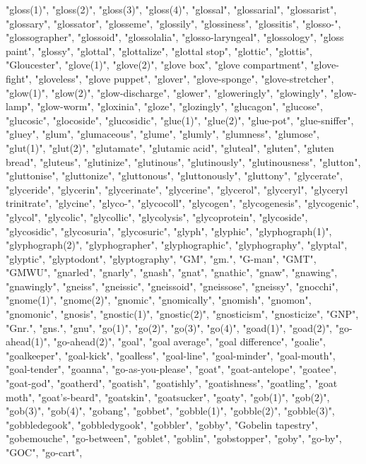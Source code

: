 "gloss(1)",
"gloss(2)",
"gloss(3)",
"gloss(4)",
"glossal",
"glossarial",
"glossarist",
"glossary",
"glossator",
"glosseme",
"glossily",
"glossiness",
"glossitis",
"glosso-",
"glossographer",
"glossoid",
"glossolalia",
"glosso-laryngeal",
"glossology",
"gloss paint",
"glossy",
"glottal",
"glottalize",
"glottal stop",
"glottic",
"glottis",
"Gloucester",
"glove(1)",
"glove(2)",
"glove box",
"glove compartment",
"glove-fight",
"gloveless",
"glove puppet",
"glover",
"glove-sponge",
"glove-stretcher",
"glow(1)",
"glow(2)",
"glow-discharge",
"glower",
"gloweringly",
"glowingly",
"glow-lamp",
"glow-worm",
"gloxinia",
"gloze",
"glozingly",
"glucagon",
"glucose",
"glucosic",
"glocoside",
"glucosidic",
"glue(1)",
"glue(2)",
"glue-pot",
"glue-sniffer",
"gluey",
"glum",
"glumaceous",
"glume",
"glumly",
"glumness",
"glumose",
"glut(1)",
"glut(2)",
"glutamate",
"glutamic acid",
"gluteal",
"gluten",
"gluten bread",
"gluteus",
"glutinize",
"glutinous",
"glutinously",
"glutinousness",
"glutton",
"gluttonise",
"gluttonize",
"gluttonous",
"gluttonously",
"gluttony",
"glycerate",
"glyceride",
"glycerin",
"glycerinate",
"glycerine",
"glycerol",
"glyceryl",
"glyceryl trinitrate",
"glycine",
"glyco-",
"glycocoll",
"glycogen",
"glycogenesis",
"glycogenic",
"glycol",
"glycolic",
"glycollic",
"glycolysis",
"glycoprotein",
"glycoside",
"glycosidic",
"glycosuria",
"glycosuric",
"glyph",
"glyphic",
"glyphograph(1)",
"glyphograph(2)",
"glyphographer",
"glyphographic",
"glyphography",
"glyptal",
"glyptic",
"glyptodont",
"glyptography",
"GM",
"gm.",
"G-man",
"GMT",
"GMWU",
"gnarled",
"gnarly",
"gnash",
"gnat",
"gnathic",
"gnaw",
"gnawing",
"gnawingly",
"gneiss",
"gneissic",
"gneissoid",
"gneissose",
"gneissy",
"gnocchi",
"gnome(1)",
"gnome(2)",
"gnomic",
"gnomically",
"gnomish",
"gnomon",
"gnomonic",
"gnosis",
"gnostic(1)",
"gnostic(2)",
"gnosticism",
"gnosticize",
"GNP",
"Gnr.",
"gns.",
"gnu",
"go(1)",
"go(2)",
"go(3)",
"go(4)",
"goad(1)",
"goad(2)",
"go-ahead(1)",
"go-ahead(2)",
"goal",
"goal average",
"goal difference",
"goalie",
"goalkeeper",
"goal-kick",
"goalless",
"goal-line",
"goal-minder",
"goal-mouth",
"goal-tender",
"goanna",
"go-as-you-please",
"goat",
"goat-antelope",
"goatee",
"goat-god",
"goatherd",
"goatish",
"goatishly",
"goatishness",
"goatling",
"goat moth",
"goat's-beard",
"goatskin",
"goatsucker",
"goaty",
"gob(1)",
"gob(2)",
"gob(3)",
"gob(4)",
"gobang",
"gobbet",
"gobble(1)",
"gobble(2)",
"gobble(3)",
"gobbledegook",
"gobbledygook",
"gobbler",
"gobby",
"Gobelin tapestry",
"gobemouche",
"go-between",
"goblet",
"goblin",
"gobstopper",
"goby",
"go-by",
"GOC",
"go-cart",
